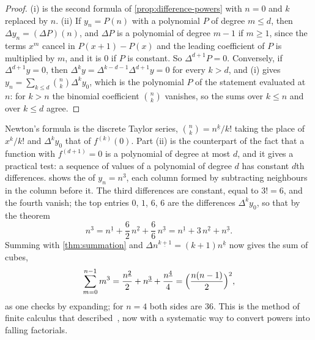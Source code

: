 \begin{proof}
(i) is the second formula of \cref{prop:difference-powers} with $n=0$ and $k$ replaced by $n$. (ii) If $y_n=P(n)$ with a polynomial $P$ of degree $m\le d$, then $\Delta y_n=(\Delta P)(n)$, and $\Delta P$ is a polynomial of degree $m-1$ if $m\ge1$, since the terms $x^m$ cancel in $P(x+1)-P(x)$ and the leading coefficient of $P$ is multiplied by $m$, and it is $0$ if $P$ is constant. So $\Delta^{d+1}P=0$. Conversely, if $\Delta^{d+1}y=0$, then $\Delta^ky=\Delta^{k-d-1}\Delta^{d+1}y=0$ for every $k>d$, and (i) gives $y_n=\sum_{k\le d}\binom nk\Delta^ky_0$, which is the polynomial $P$ of the statement evaluated at $n$: for $k>n$ the binomial coefficient $\binom nk$ vanishes, so the sums over $k\le n$ and over $k\le d$ agree.
\end{proof}

Newton's formula is the discrete Taylor series, $\binom nk=n^{\underline k}/k!$ taking the place of $x^k/k!$ and $\Delta^ky_0$ that of $f^{(k)}(0)$. Part (ii) is the counterpart of the fact that a function with $f^{(d+1)}=0$ is a polynomial of degree at most $d$, and it gives a practical test: a sequence of values of a polynomial of degree $d$ has constant $d$th differences.  shows the  of $y_n=n^3$, each column formed by subtracting neighbours in the column before it. The third differences are constant, equal to $3!=6$, and the fourth vanish; the top entries $0$, $1$, $6$, $6$ are the differences $\Delta^ky_0$, so that by the theorem
\[
n^3=n^{\underline1}+\frac62\,n^{\underline2}+\frac66\,n^{\underline3}=n^{\underline1}+3\,n^{\underline2}+n^{\underline3} .
\]
Summing with \cref{thm:summation} and $\Delta n^{\underline{k+1}}=(k+1)n^{\underline k}$ now gives the sum of cubes,
\[
\sum_{m=0}^{n-1}m^3=\frac{n^{\underline2}}2+n^{\underline3}+\frac{n^{\underline4}}4=\Bigl(\frac{n(n-1)}2\Bigr)^2 ,
\]
as one checks by expanding; for $n=4$ both sides are $36$. This is the method of finite calculus that  described~\cite[Sect.~2.6]{graham1994concrete}, now with a systematic way to convert powers into falling factorials.

